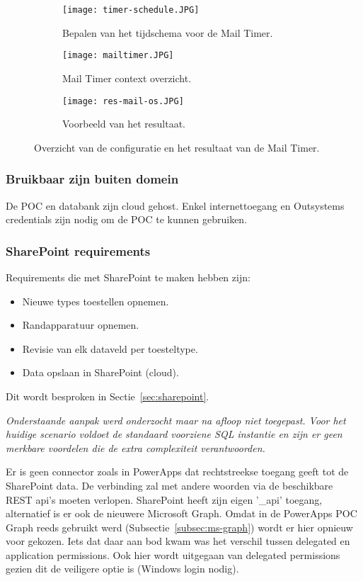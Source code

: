 \begin{figure}[h!]
    \centering
    \begin{subfigure}[b]{0.5\linewidth}
        \texttt{[image: timer-schedule.JPG]}
        \caption{Bepalen van het tijdschema voor de Mail Timer.}
    \end{subfigure}
    \begin{subfigure}[b]{0.45\linewidth}
        \texttt{[image: mailtimer.JPG]}
        \caption{Mail Timer context overzicht.}
    \end{subfigure}
    \begin{subfigure}[b]{0.6\linewidth}
        \texttt{[image: res-mail-os.JPG]}
        \caption{Voorbeeld van het resultaat.}
    \end{subfigure}
    \caption{Overzicht van de configuratie en het resultaat van de Mail Timer.}
    \label{fig:mail-timer}
\end{figure}

\subsubsection{Bruikbaar zijn buiten domein}

De POC en databank zijn cloud gehost. Enkel internettoegang en Outsystems credentials zijn nodig om de POC te kunnen gebruiken.

\subsubsection{SharePoint requirements}

Requirements die met SharePoint te maken hebben zijn:
\begin{itemize}
    \item Nieuwe types toestellen opnemen.
    \item Randapparatuur opnemen.
    \item Revisie van elk dataveld per toesteltype.
    \item Data opslaan in SharePoint (cloud).
\end{itemize}
Dit wordt besproken in Sectie~\ref{sec:sharepoint}.

\textit{Onderstaande aanpak werd onderzocht maar na afloop niet toegepast. Voor het huidige scenario voldoet de standaard voorziene SQL instantie en zijn er geen merkbare voordelen die de extra complexiteit verantwoorden.}

Er is geen connector zoals in PowerApps dat rechtstreekse toegang geeft tot de SharePoint data. De verbinding zal met andere woorden via de beschikbare REST api's moeten verlopen. SharePoint heeft zijn eigen '\_api' toegang, alternatief is er ook de nieuwere Microsoft Graph. Omdat in de PowerApps POC Graph reeds gebruikt werd (Subsectie~\ref{subsec:ms-graph}) wordt er hier opnieuw voor gekozen. Iets dat daar aan bod kwam was het verschil tussen delegated en application permissions. Ook hier wordt uitgegaan van delegated permissions gezien dit de veiligere optie is (Windows login nodig).

